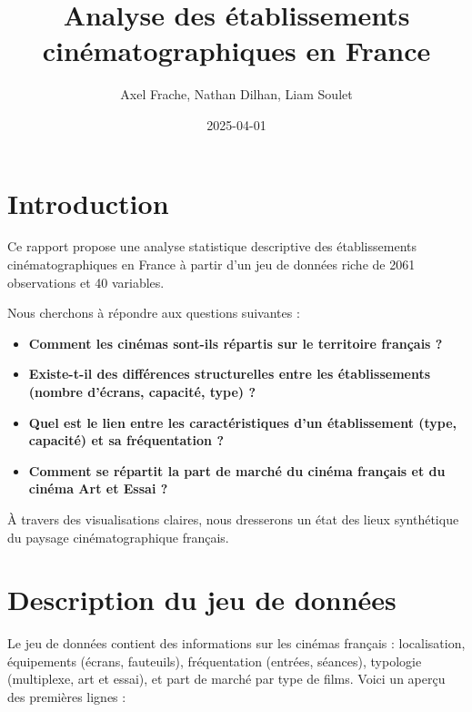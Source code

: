 \documentclass[
]{article}
\title{Analyse des établissements cinématographiques en France}
\author{Axel Frache, Nathan Dilhan, Liam Soulet}
\date{2025-04-01}
\providecommand{\tightlist}{%
  \setlength{\itemsep}{0pt}\setlength{\parskip}{0pt}}
\begin{document}
\maketitle

{
\setcounter{tocdepth}{2}
\tableofcontents
}
\section{Introduction}\label{introduction}

Ce rapport propose une analyse statistique descriptive des
établissements cinématographiques en France à partir d'un jeu de données
riche de 2061 observations et 40 variables.

Nous cherchons à répondre aux questions suivantes :

\begin{itemize}
\tightlist
\item
  \textbf{Comment les cinémas sont-ils répartis sur le territoire
  français ?}
\item
  \textbf{Existe-t-il des différences structurelles entre les
  établissements (nombre d'écrans, capacité, type) ?}
\item
  \textbf{Quel est le lien entre les caractéristiques d'un établissement
  (type, capacité) et sa fréquentation ?}
\item
  \textbf{Comment se répartit la part de marché du cinéma français et du
  cinéma Art et Essai ?}
\end{itemize}

À travers des visualisations claires, nous dresserons un état des lieux
synthétique du paysage cinématographique français.

\section{Description du jeu de
données}\label{description-du-jeu-de-donnuxe9es}

Le jeu de données contient des informations sur les cinémas français :
localisation, équipements (écrans, fauteuils), fréquentation (entrées,
séances), typologie (multiplexe, art et essai), et part de marché par
type de films. Voici un aperçu des premières lignes :
\end{document}
